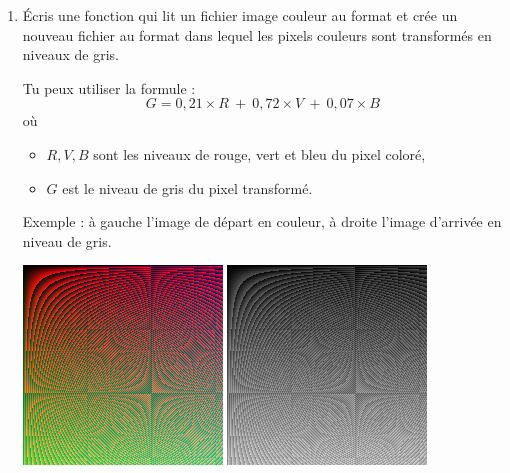\documentclass[11pt,class=report,crop=false]{standalone}
\begin{document}
\begin{activite}
\begin{enumerate}
\item Écris une fonction  qui lit un fichier image couleur au format  et crée un nouveau fichier au format  dans lequel les pixels couleurs sont transformés en niveaux de gris. 

Tu peux utiliser la formule :
$$G = 0,21 \times R \  + \  0,72 \times V \  + \  0,07 \times B$$
où
\begin{itemize}
  \item $R,V,B$ sont les niveaux de rouge, vert et bleu du pixel coloré,
  \item $G$ est le niveau de gris du pixel transformé.
\end{itemize}

Exemple : à gauche l'image de départ en couleur, à droite l'image d'arrivée en niveau de gris.
\begin{center}
\includegraphics[scale=0.5]{ecran-image_coul}\qquad\qquad
\includegraphics[scale=0.5]{ecran-image_coul_gris}
\end{center} 


\end{enumerate}   
     
\end{activite}


\end{document}
